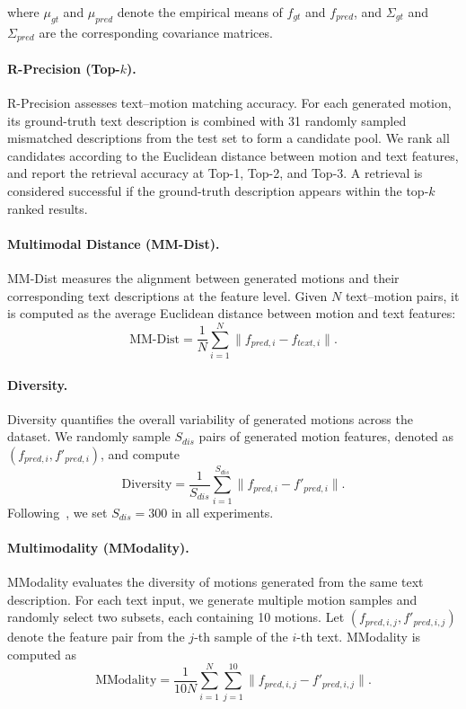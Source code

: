 \documentclass[10pt,journal,compsoc]{IEEEtran}
\begin{document}
where $\mu_{gt}$ and $\mu_{pred}$ denote the empirical means of $f_{gt}$ and $f_{pred}$, and $\Sigma_{gt}$ and $\Sigma_{pred}$ are the corresponding covariance matrices.

\paragraph{R-Precision (Top-$k$).}
R-Precision assesses text--motion matching accuracy. For each generated motion, its ground-truth text description is combined with 31 randomly sampled mismatched descriptions from the test set to form a candidate pool. We rank all candidates according to the Euclidean distance between motion and text features, and report the retrieval accuracy at Top-1, Top-2, and Top-3. A retrieval is considered successful if the ground-truth description appears within the top-$k$ ranked results.

\paragraph{Multimodal Distance (MM-Dist).}
MM-Dist measures the alignment between generated motions and their corresponding text descriptions at the feature level. Given $N$ text--motion pairs, it is computed as the average Euclidean distance between motion and text features:
\begin{equation}
\text{MM-Dist} = \frac{1}{N}\sum_{i=1}^{N}\lVert f_{pred,i} - f_{text,i} \rVert .
\label{formula:mm-dis}
\end{equation}

\paragraph{Diversity.}
Diversity quantifies the overall variability of generated motions across the dataset. We randomly sample $S_{dis}$ pairs of generated motion features, denoted as $(f_{pred,i}, f'_{pred,i})$, and compute
\begin{equation}
\text{Diversity} = \frac{1}{S_{dis}}\sum_{i=1}^{S_{dis}} \lVert f_{pred,i} - f'_{pred,i} \rVert .
\label{formula:diversity}
\end{equation}
Following~\cite{humanml3d}, we set $S_{dis}=300$ in all experiments.

\paragraph{Multimodality (MModality).}
MModality evaluates the diversity of motions generated from the same text description. For each text input, we generate multiple motion samples and randomly select two subsets, each containing 10 motions. Let $(f_{pred,i,j}, f'_{pred,i,j})$ denote the feature pair from the $j$-th sample of the $i$-th text. MModality is computed as
\begin{equation}
\text{MModality} = \frac{1}{10N}\sum_{i=1}^{N}\sum_{j=1}^{10}\lVert f_{pred,i,j} - f'_{pred,i,j} \rVert .
\label{formula:mmodality}
\end{equation}
\end{document}
